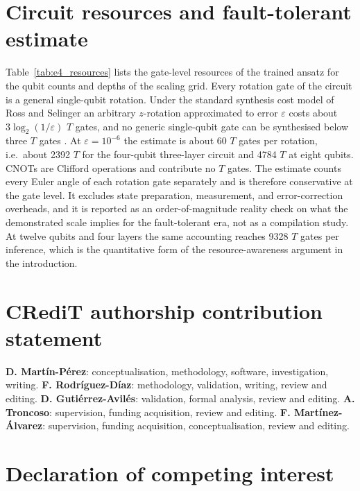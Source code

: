\documentclass[preprint,number,sort&compress]{elsarticle}
\begin{document}
\appendix
\section{Circuit resources and fault-tolerant estimate}
\label{app:resources}

Table~\ref{tab:e4_resources} lists the gate-level resources of the trained
ansatz for the qubit counts and depths of the scaling grid. Every rotation
gate of the circuit is a general single-qubit rotation. Under the standard
synthesis cost model of Ross and Selinger \cite{ross2016optimal} an
arbitrary $z$-rotation approximated to error $\varepsilon$ costs about
$3\log_2(1/\varepsilon)$ $T$ gates, and no generic single-qubit gate can be
synthesised below three $T$ gates \cite{bocharov2012resource}. At
$\varepsilon=10^{-6}$ the estimate is about
60 $T$ gates per rotation,
i.e.\ about 2392 $T$ for the four-qubit
three-layer circuit and 4784 $T$ at eight
qubits. CNOTs are Clifford operations and contribute no $T$ gates. The
estimate counts every Euler angle of each rotation gate separately and is
therefore conservative at the gate level. It excludes state preparation,
measurement, and error-correction overheads, and it is reported as an
order-of-magnitude reality check on what the demonstrated scale implies for
the fault-tolerant era, not as a compilation study. At twelve qubits and
four layers the same accounting reaches 9328
$T$ gates per inference, which is the quantitative form of the
resource-awareness argument in the introduction.



\section*{CRediT authorship contribution statement}

\textbf{D. Mart\'in-P\'erez}: conceptualisation, methodology, software,
investigation, writing. \textbf{F. Rodr\'iguez-D\'iaz}: methodology,
validation, writing, review and editing. \textbf{D. Guti\'errez-Avil\'es}:
validation, formal analysis, review and editing. \textbf{A. Troncoso}:
supervision, funding acquisition, review and editing.
\textbf{F. Mart\'inez-\'Alvarez}: supervision, funding acquisition,
conceptualisation, review and editing.

\section*{Declaration of competing interest}
\end{document}
